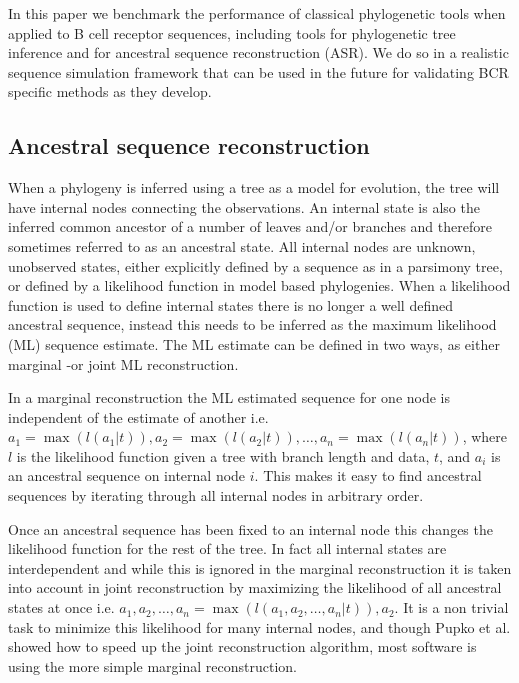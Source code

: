 In this paper we benchmark the performance of classical phylogenetic tools when applied to B cell receptor sequences, including tools for phylogenetic tree inference and for ancestral sequence reconstruction (ASR).
We do so in a realistic sequence simulation framework that can be used in the future for validating BCR specific methods as they develop.




\subsection{Ancestral sequence reconstruction}
When a phylogeny is inferred using a tree as a model for evolution, the tree will have internal nodes connecting the observations.
An internal state is also the inferred common ancestor of a number of leaves and/or branches and therefore sometimes referred to as an ancestral state.
All internal nodes are unknown, unobserved states, either explicitly defined by a sequence as in a parsimony tree, or defined by a likelihood function in model based phylogenies.
When a likelihood function is used to define internal states there is no longer a well defined ancestral sequence, instead this needs to be inferred as the maximum likelihood (ML) sequence estimate.
The ML estimate can be defined in two ways, as either marginal -or joint ML reconstruction.

In a marginal reconstruction the ML estimated sequence for one node is independent of the estimate of another i.e. $a_1 = \operatorname{max}(l(a_1 | t)), a_2 = \operatorname{max}(l(a_2 | t)), \hdots, a_n = \operatorname{max}(l(a_n | t))$, where $l$ is the likelihood function given a tree with branch length and data, $t$, and $a_i$ is an ancestral sequence on internal node $i$.
This makes it easy to find ancestral sequences by iterating through all internal nodes in arbitrary order.

Once an ancestral sequence has been fixed to an internal node this changes the likelihood function for the rest of the tree.
In fact all internal states are interdependent and while this is ignored in the marginal reconstruction it is taken into account in joint reconstruction by maximizing the likelihood of all ancestral states at once i.e. $a_1, a_2, \hdots, a_n = \operatorname{max}(l(a_1, a_2, \hdots, a_n | t)), a_2$.
It is a non trivial task to minimize this likelihood for many internal nodes, and though Pupko et al. \cite{pupko2000fast} showed how to speed up the joint reconstruction algorithm, most software is using the more simple marginal reconstruction.

